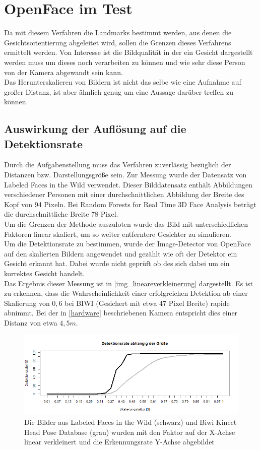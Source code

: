 \section{OpenFace im Test}
Da mit diesem Verfahren die Landmarks bestimmt werden, aus denen die Gesichtsorientierung abgeleitet wird, sollen die Grenzen dieses Verfahrens ermittelt werden. Von Interesse ist die Bildqualität in der ein Gesicht dargestellt werden muss um dieses noch verarbeiten zu können und wie sehr diese Person von der Kamera abgewandt sein kann.\\
Das Herunterskalieren von Bildern ist nicht das selbe wie eine Aufnahme auf großer Distanz, ist aber ähnlich genug um eine Aussage darüber treffen zu können.
\subsection{Auswirkung der Auflösung auf die Detektionsrate}
Durch die Aufgabenstellung muss das Verfahren zuverlässig bezüglich der Distanzen bzw. Darstellungsgröße sein. Zur Messung wurde der Datensatz von Labeled Faces in the Wild \cite{database_Face} verwendet. Dieser Bilddatensatz enthält Abbildungen verschiedener Personen mit einer durchschnittlichen Abbildung der Breite des Kopf von 94 Pixeln. Bei Random Forests for Real Time 3D Face Analysis \cite{database_Face_Ori} beträgt die durchschnittliche Breite 78 Pixel.\\
Um die Grenzen der Methode auszuloten wurde das Bild mit unterschiedlichen Faktoren linear skaliert, um so weiter entferntere Gesichter zu simulieren.\\
Um die Detektionsrate zu bestimmen, wurde der Image-Detector von OpenFace auf den skalierten Bildern angewendet und gezählt wie oft der Detektor ein Gesicht erkannt hat. Dabei wurde nicht geprüft ob des sich dabei um ein korrektes Gesicht handelt.\\
Das Ergebnis dieser Messung ist in \autoref{img_lineareverkleinerung} dargestellt. Es ist zu erkennen, dass die Wahrscheinlichkeit einer erfolgreichen Detektion ab einer Skalierung von $0,6$ bei BIWI (Gesichert mit etwa 47 Pixel Breite) rapide abnimmt. Bei der in \autoref{hardware} beschriebenen Kamera entspricht dies einer Distanz von etwa $4,5m$.\\
\begin{figure}
	\centering
	\includegraphics[width=\linewidth]{img_Skalierung/Gesicht_Rate}
	\caption{Die Bilder aus Labeled Faces in the Wild \cite{database_Face} (schwarz) und Biwi Kinect Head Pose Database \cite{BIWI_database} (grau) wurden mit den Faktor auf der X-Achse linear verkleinert und die Erkennungsrate Y-Achse abgebildet}
	\label{img_lineareverkleinerung}
\end{figure}
